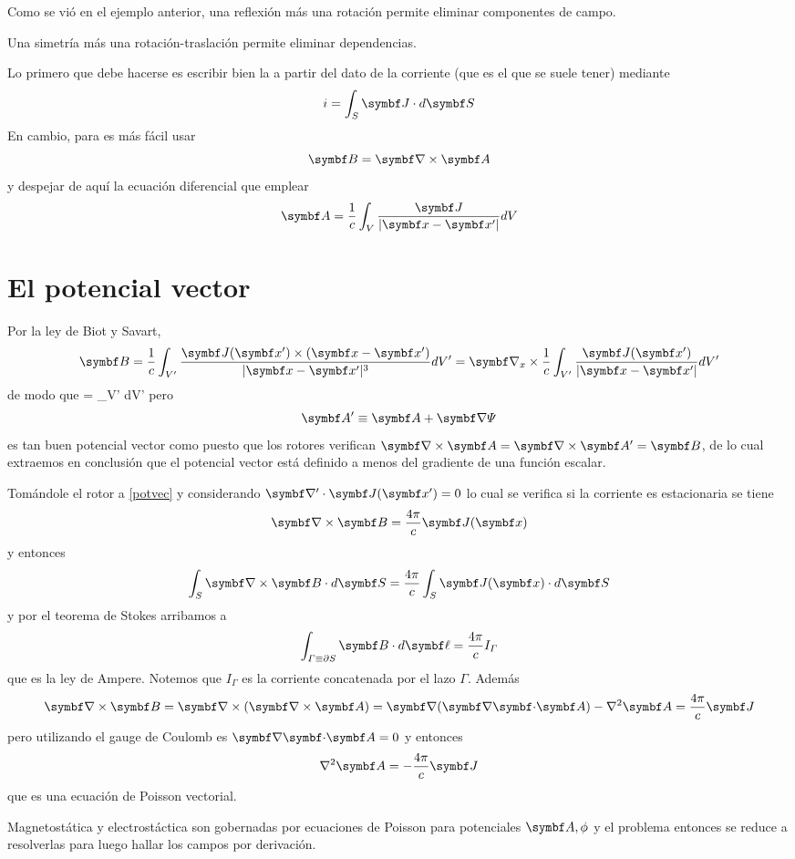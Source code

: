 \documentclass[10pt,oneside]{CBFT_book}
\begin{document}
Como se vió en el ejemplo anterior, una reflexión más una rotación permite eliminar componentes 
de campo.


Una simetría más una rotación-traslación permite eliminar dependencias.

Lo primero que debe hacerse es escribir bien la  a partir del dato de la corriente
(que es el que se suele tener) mediante
\[
	i = \int_S \vb{J} \cdot d \vb{S}
\]
En cambio, para  es más fácil usar
\[
	\vb{B} = \rotorm{A}
\]
y despejar de aquí la ecuación diferencial que emplear
\[
	\vb{A} = \frac{1}{c} \int_V \frac{\vb{J}}{|\vb{x}-\vb{x}'|} dV
\]


\section{El potencial vector}

Por la ley de Biot y Savart,
\[
	\vb{B} = \frac{1}{c} \int_{V'} \frac{\vb{J}(\vb{x}') \times (\vb{x}-\vb{x}')}{|\vb{x}-\vb{x}'|^3} 
	dV' = \Nabla_x \times \frac{1}{c} \int_{V'} \frac{\vb{J}(\vb{x}')}{|\vb{x}-\vb{x}'|} dV'
\]
de modo que
\be
	 =  \int_{V'}  dV'
	\label{potvec}
\ee
pero 
\[
	\vb{A}' \equiv \vb{A} + \Nabla \Psi
\]
es tan buen potencial vector como  puesto que los rotores verifican $\rotorm{A}=\rotorm{A}'=\vb{B}$,
de lo cual extraemos en conclusión que el potencial vector está definido a menos del gradiente de una
función escalar.

Tomándole el rotor a \eqref{potvec} y considerando $\Nabla'\cdot\vb{J}(\vb{x}')=0$ lo cual se verifica si
la corriente es estacionaria se tiene 
\[
	\rotorm{B} = \frac{4\pi}{c} \vb{J}(\vb{x})
\]
y entonces
\[
	\int_S \rotorm{B} \cdot d\vb{S} = \frac{4\pi}{c} \int_S \vb{J}(\vb{x}) \cdot d\vb{S}
\]
y por el teorema de Stokes arribamos a
\[
	\int_{\Gamma\equiv\partial S} \vb{B}\cdot d\vb{\ell} = \frac{4\pi}{c} I_\Gamma
\]
que es la ley de Ampere. Notemos que $I_\Gamma$ es la corriente concatenada por el lazo $\Gamma$.
Además
\[
	\rotorm{B} = \Nabla\times(\rotorm{A}) = \Nabla(\divem{A}) - \nabla^2 \vb{A} = \frac{4\pi}{c}\vb{J}
\]
pero utilizando el gauge de Coulomb es $\divem{A}=0$ y entonces
\[
	\nabla^2 \vb{A} = -\frac{4\pi}{c}\vb{J}
\]
que es una ecuación de Poisson vectorial.

Magnetostática y electrostáctica son gobernadas por ecuaciones de Poisson para potenciales $\vb{A},\phi$ y
el problema entonces se reduce a resolverlas para luego hallar los campos por derivación.
\end{document}
